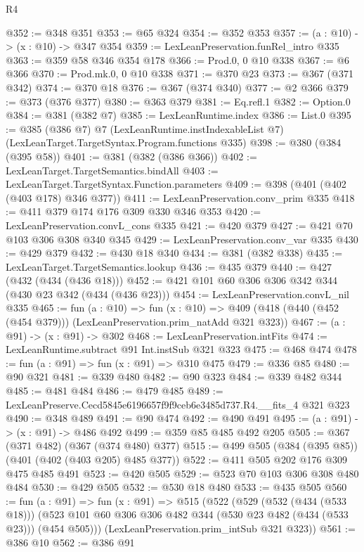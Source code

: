 \begin{lexlean}{R4}
\begin{coremodule}
@352 := @348 @351
@353 := @65 @324
@354 := @352 @353
@357 := (a : @10) -> (x : @10) -> @347 @354
@359 := LexLeanPreservation.funRel_intro @335
@363 := @359 @58 @346 @354 @178
@366 := Prod.{0, 0} @10 @338
@367 := @6 @366
@370 := Prod.mk.{0, 0} @10 @338
@371 := @370 @23
@373 := @367 (@371 @342)
@374 := @370 @18
@376 := @367 (@374 @340)
@377 := @2 @366
@379 := @373 (@376 @377)
@380 := @363 @379
@381 := Eq.refl.{1}
@382 := Option.{0}
@384 := @381 (@382 @7)
@385 := LexLeanRuntime.index
@386 := List.{0}
@395 := @385
    (@386 @7)
    @7
    (LexLeanRuntime.instIndexableList @7)
    (LexLeanTarget.TargetSyntax.Program.functions @335)
@398 := @380 (@384 (@395 @58))
@401 := @381 (@382 (@386 @366))
@402 := LexLeanTarget.TargetSemantics.bindAll
@403 := LexLeanTarget.TargetSyntax.Function.parameters
@409 := @398 (@401 (@402 (@403 @178) @346 @377))
@411 := LexLeanPreservation.conv_prim @335
@418 := @411 @379 @174 @176 @309 @330 @346 @353
@420 := LexLeanPreservation.convL_cons @335
@421 := @420 @379
@427 := @421 @70 @103 @306 @308 @340 @345
@429 := LexLeanPreservation.conv_var @335
@430 := @429 @379
@432 := @430 @18 @340
@434 := @381 (@382 @338)
@435 := LexLeanTarget.TargetSemantics.lookup
@436 := @435 @379
@440 := @427 (@432 (@434 (@436 @18)))
@452 := @421 @101 @60 @306 @306 @342 @344 (@430 @23 @342 (@434 (@436 @23)))
@454 := LexLeanPreservation.convL_nil @335
@465 := fun (a : @10) =>
  fun (x : @10) => @409 (@418 (@440 (@452 (@454 @379))) (LexLeanPreservation.prim_natAdd @321 @323))
@467 := (a : @91) -> (x : @91) -> @302
@468 := LexLeanPreservation.intFits
@474 := LexLeanRuntime.subtract @91 Int.instSub @321 @323
@475 := @468 @474
@478 := fun (a : @91) => fun (x : @91) => @310 @475
@479 := @336 @85
@480 := @90 @321
@481 := @339 @480
@482 := @90 @323
@484 := @339 @482 @344
@485 := @481 @484
@486 := @479 @485
@489 := LexLeanPreserve.Cecd5845e6196657f9f9ceb6e3485d737.R4.__fits_4 @321 @323
@490 := @348 @489
@491 := @90 @474
@492 := @490 @491
@495 := (a : @91) -> (x : @91) -> @486 @492
@499 := @359 @85 @485 @492 @205
@505 := @367 (@371 @482) (@367 (@374 @480) @377)
@515 := @499 @505 (@384 (@395 @85)) (@401 (@402 (@403 @205) @485 @377))
@522 := @411 @505 @202 @176 @309 @475 @485 @491
@523 := @420 @505
@529 := @523 @70 @103 @306 @308 @480 @484
@530 := @429 @505
@532 := @530 @18 @480
@533 := @435 @505
@560 := fun (a : @91) =>
  fun (x : @91) =>
  @515
    (@522
      (@529
        (@532 (@434 (@533 @18)))
        (@523 @101 @60 @306 @306 @482 @344 (@530 @23 @482 (@434 (@533 @23))) (@454 @505)))
      (LexLeanPreservation.prim_intSub @321 @323))
@561 := @386 @10
@562 := @386 @91

\end{coremodule}
\end{lexlean}
